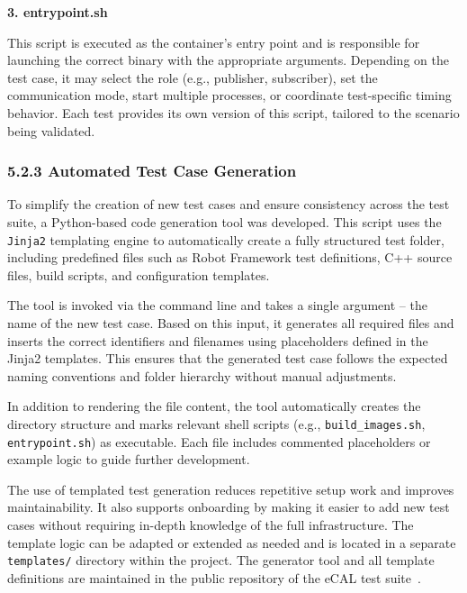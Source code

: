 \vspace{1em}
\textbf{3. entrypoint.sh}

\vspace{0.3em}
This script is executed as the container's entry point and is responsible for launching the correct binary with the appropriate arguments. Depending on the test case, it may select the role (e.g., publisher, subscriber), set the communication mode, start multiple processes, or coordinate test-specific timing behavior. Each test provides its own version of this script, tailored to the scenario being validated.


\subsubsection*{5.2.3 Automated Test Case Generation}

To simplify the creation of new test cases and ensure consistency across the test suite, a Python-based code generation tool was developed. This script uses the \texttt{Jinja2} templating engine to automatically create a fully structured test folder, including predefined files such as Robot Framework test definitions, C++ source files, build scripts, and configuration templates.

\vspace{1em}
The tool is invoked via the command line and takes a single argument – the name of the new test case. Based on this input, it generates all required files and inserts the correct identifiers and filenames using placeholders defined in the Jinja2 templates. This ensures that the generated test case follows the expected naming conventions and folder hierarchy without manual adjustments.

\vspace{1em}
In addition to rendering the file content, the tool automatically creates the directory structure and marks relevant shell scripts (e.g., \texttt{build\_images.sh}, \texttt{entrypoint.sh}) as executable. Each file includes commented placeholders or example logic to guide further development.

\vspace{1em}
The use of templated test generation reduces repetitive setup work and improves maintainability. It also supports onboarding by making it easier to add new test cases without requiring in-depth knowledge of the full infrastructure. The template logic can be adapted or extended as needed and is located in a separate \texttt{templates/} directory within the project. The generator tool and all template definitions are maintained in the public repository of the eCAL test suite~\cite{ecal_test_generator, ecal_test_suite_repo}.


